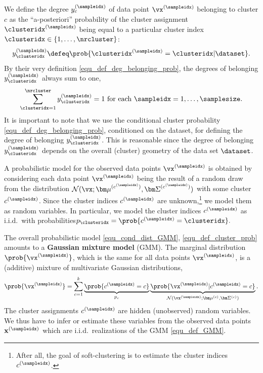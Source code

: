 \documentclass[12pt]{report}
\begin{document}
We define the degree $y^{(\sampleidx)}_{c}$ of data point $\vx^{(\sampleidx)}$ 
belonging to cluster $c$ as the ``a-posteriori'' probability of the cluster 
assignment $\clusteridx^{(\sampleidx)}$ being equal to a particular
cluster index $\clusteridx \in \{1,\ldots,\nrcluster\}$: 
\begin{equation}
\label{equ_def_deg_belonging_prob}
y^{(\sampleidx)}_{\clusteridx} \defeq \prob{ \clusteridx^{(\sampleidx)} = \clusteridx | \dataset}.
\end{equation} 
By their very definition \eqref{equ_def_deg_belonging_prob}, 
the degrees of belonging $y^{(\sampleidx)}_{\clusteridx}$ always 
sum to one, 
\begin{equation} 
\label{equ_dob_sum_to_one}
\sum_{\clusteridx=1}^{\nrcluster} y^{(\sampleidx)}_{\clusteridx}=1 \mbox{ for each } \sampleidx=1,\ldots,\samplesize.
\end{equation}  
It is important to note that we use the conditional cluster 
probability \eqref{equ_def_deg_belonging_prob}, conditioned 
on the dataset, for defining the degree of belonging $y^{(\sampleidx)}_{\clusteridx}$. 
This is reasonable since the degree of belonging $y^{(\sampleidx)}_{\clusteridx}$ 
depends on the overall (cluster) geometry of the data set $\dataset$.

A probabilistic model for the observed data points $\vx^{(\sampleidx)}$ 
is obtained by considering each data point $\vx^{(\sampleidx)}$ being 
the result of a random draw from the distribution $\mathcal{N} (\vx ; {\bm \mu}^{(c^{(\sampleidx)})}, {\bm \Sigma}^{(c^{(\sampleidx)})})$ 
with some cluster $c^{(\sampleidx)}$. Since the cluster indices $c^{(\sampleidx)}$ 
are unknown,\footnote{After all, the goal of soft-clustering is to estimate the 
cluster indices $c^{(\sampleidx)}$.} we model them as random variables. 
In particular, we model the cluster indices $c^{(\sampleidx)}$ as i.i.d.\ with 
probabilities$p_{\clusteridx} = \prob{ c^{(\sampleidx)} = \clusteridx}.$ 

The overall probabilistic model \eqref{equ_cond_dist_GMM}, \eqref{equ_def_cluster_prob} 
amounts to a {\bf Gaussian mixture model} (GMM). The marginal distribution $\prob{\vx^{(\sampleidx)}}$, 
which is the same for all data points $\vx^{(\sampleidx)}$, is a (additive) mixture of 
multivariate Gaussian distributions, 
\begin{equation} 
\label{equ_def_GMM}
 \prob{\vx^{(\sampleidx)}} = \sum_{c=1}^{k} \underbrace{\prob{c^{(\sampleidx)}=c}}_{p_{c}}  \underbrace{\prob{\vx^{(\sampleidx)} | c^{(\sampleidx)}=c}}_{\mathcal{N}(\vx^{(\sampleidx)};{\bm \mu}^{(c)}, {\bm \Sigma}^{(c)})}. 
\end{equation} 
The cluster assignments $c^{(\sampleidx)}$ are hidden (unobserved) random 
variables. We thus have to infer or estimate these variables from the observed 
data points $\mathbf{x}^{(\sampleidx)}$ which are i.i.d.\ realizations of the GMM \eqref{equ_def_GMM}. 
\end{document}
